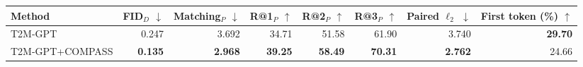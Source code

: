 \begin{tabular*}{\textwidth}{@{\extracolsep{\fill}}lrrrrrrr@{}}
\toprule
Method & FID$_D$ $\downarrow$ & Matching$_P$ $\downarrow$ & R@1$_P$ $\uparrow$ & R@2$_P$ $\uparrow$ & R@3$_P$ $\uparrow$ & Paired $\ell_2$ $\downarrow$ & First token (\%) $\uparrow$ \\
\midrule
T2M-GPT & 0.247 & 3.692 & 34.71 & 51.58 & 61.90 & 3.740 & \textbf{29.70} \\
T2M-GPT+COMPASS & \textbf{0.135} & \textbf{2.968} & \textbf{39.25} & \textbf{58.49} & \textbf{70.31} & \textbf{2.762} & 24.66 \\
\bottomrule
\end{tabular*}
